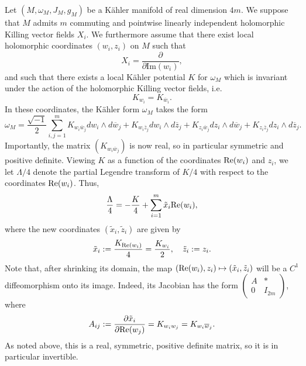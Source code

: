 \documentclass[11pt,reqno]{amsart}
\theoremstyle{plain}
\theoremstyle{definition}
\numberwithin{equation}{section}
\begin{document}
Let $(M,\omega_M,J_M,g_M)$ be a Kähler manifold of real dimension $4m$. We suppose that $M$ admits $m$ commuting and pointwise linearly independent holomorphic Killing vector fields $X_{i}$. 
We furthermore assume that there exist
local holomorphic coordinates $(w_{i},z_{i})$ on $M$ such that
$$X_{i}=\frac{\partial}{\partial \mathrm{Im}(w_{i})},$$
and such that there exists a local Kähler potential $K$ for $\omega_M$ which is invariant under the action of the holomorphic Killing vector fields, i.e.
$$K_{w_{i}}=K_{\overline{w}_{i}}.$$
In these coordinates, the Kähler form $\omega_M$ takes the form
$$\omega_M=\frac{\sqrt{-1}}{2} \sum_{i,j=1}^{m}K_{w_{i}\overline{w}_j}dw_{i}\wedge d\overline{w}_j+K_{w_{i}\overline{z}_j}dw_{i}\wedge d\overline{z}_j+K_{z_{i}\overline{w}_j}dz_{i}\wedge d\overline{w}_j+K_{z_{i}\overline{z}_j}dz_{i}\wedge d\overline{z}_j.$$
Importantly, the matrix $(K_{w_i \overline{w}_j})$ is now real, so in particular symmetric and positive definite. Viewing $K$ as a function of the coordinates ${\rm Re}(w_i)$ and $z_i$, we let $\Lambda/4$ denote the partial Legendre transform of $K/4$ with respect to the coordinates ${\rm Re}(w_i)$. Thus,
\begin{equation}\label{LT}
    \frac{\Lambda}{4}=-\frac{K}{4}+ \sum_{i=1}^{m} \tilde{x}_{i}{\rm Re}(w_i),
\end{equation}
where the new coordinates $(\tilde{x}_i,\tilde{z}_{i})$ are given by
$$\tilde{x}_{i}:=\frac{K_{{\rm Re}(w_i)}}{4}=\frac{K_{w_{i}}}{2},\quad  \tilde{z}_{i}:={z}_{i}.$$
Note that, after shrinking its domain, the map $({\rm Re}(w_i),z_i) \mapsto (\tilde{x}_i, \tilde{z}_i)$ will be a $C^1$ diffeomorphism onto its image. Indeed, its Jacobian has the form $(\begin{smallmatrix}A & \ast \\ 0 & I_{2m}\end{smallmatrix})$, where
\begin{equation}\label{Jacobian}
A_{ij} := \frac{\partial \tilde{x}_{i}}{\partial {\rm Re}(w_{j})} = K_{w_i w_j} = K_{w_i \overline{w}_j}.
\end{equation}
As noted above, this is a real, symmetric, positive definite matrix, so it is in particular invertible.
\end{document}
